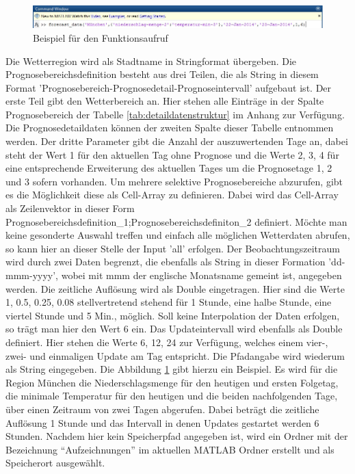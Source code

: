 \begin{figure}
\centering
\includegraphics[scale=0.7]{programm/funkaufruf}
\caption{Beispiel für den Funktionsaufruf}
\label{fig:funkaufruf}
\end{figure}
Die Wetterregion wird als Stadtname in Stringformat übergeben. Die Prognosebereichsdefinition besteht aus drei Teilen, die als String in diesem Format 'Prognosebereich-Prognosedetail-Prognoseintervall' aufgebaut ist. Der erste Teil gibt den Wetterbereich an. Hier stehen alle Einträge in der Spalte Prognosebereich der Tabelle \ref{tab:detaildatenstruktur} im Anhang zur Verfügung. Die Prognosedetaildaten können der zweiten Spalte dieser Tabelle entnommen werden. Der dritte Parameter gibt die Anzahl der auszuwertenden Tage an, dabei steht der Wert 1 für den aktuellen Tag ohne Prognose und die Werte 2, 3, 4 für eine entsprechende Erweiterung des aktuellen Tages um die Prognosetage 1, 2 und 3 sofern vorhanden. Um mehrere selektive Prognosebereiche abzurufen, gibt es die Möglichkeit diese als Cell-Array zu definieren. Dabei wird das Cell-Array als Zeilenvektor in dieser Form {Prognosebereichsdefinition\_1;Prognosebereichsdefiniton\_2} definiert. Möchte man keine gesonderte Auswahl treffen und einfach alle möglichen Wetterdaten abrufen, so kann hier an dieser Stelle der Input 'all' erfolgen. Der Beobachtungszeitraum wird durch zwei Daten begrenzt, die ebenfalls als String in dieser Formation 'dd-mmm-yyyy', wobei mit mmm der englische Monatsname gemeint ist, angegeben werden. Die zeitliche Auflösung wird als Double eingetragen. Hier sind die Werte 1, 0.5, 0.25, 0.08 stellvertretend stehend für 1 Stunde, eine halbe Stunde, eine viertel Stunde und 5 Min., möglich. Soll keine Interpolation der Daten erfolgen, so trägt man hier den Wert 6 ein. Das Updateintervall wird ebenfalls als Double definiert. Hier stehen die Werte 6, 12, 24 zur Verfügung, welches einem vier-, zwei- und einmaligen Update am Tag entspricht. Die Pfadangabe wird wiederum als String eingegeben. Die Abbildung \ref{fig:funkaufruf} gibt hierzu ein Beispiel. Es wird für die Region München die Niederschlagsmenge für den heutigen und ersten Folgetag, die minimale Temperatur für den heutigen und die beiden nachfolgenden Tage, über einen Zeitraum von zwei Tagen abgerufen. Dabei beträgt die zeitliche Auflösung 1 Stunde und das Intervall in denen Updates gestartet werden 6 Stunden. Nachdem hier kein Speicherpfad angegeben ist, wird ein Ordner mit der Bezeichnung \enquote{Aufzeichnungen} im aktuellen MATLAB Ordner erstellt und als Speicherort ausgewählt. 
